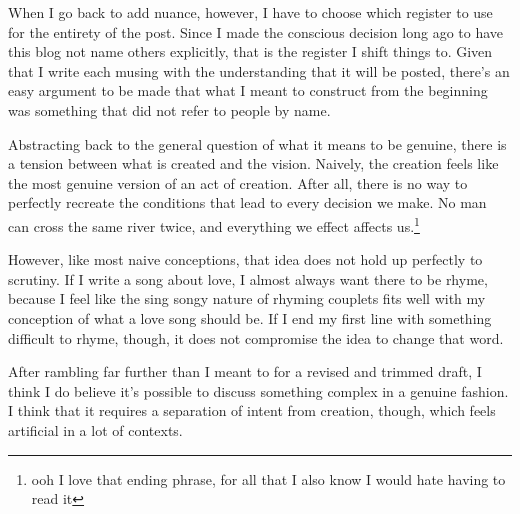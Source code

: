 \documentclass[12pt]{article}[titlepage]
\newcommand{\1}{\={a}}
\newcommand{\2}{\={e}}
\newcommand{\3}{\={\i}}
\newcommand{\4}{\=o}
\newcommand{\5}{\=u}
\newcommand{\6}{\={A}}
\renewcommand{\,}{\textsuperscript{,}}
\begin{document}
When I go back to add nuance, however, I have to choose which register to use for the entirety of the post.
Since I made the conscious decision long ago to have this blog not name others explicitly, that is the register I shift things to.
Given that I write each musing with the understanding that it will be posted, there's an easy argument to be made that what I meant to construct from the beginning was something that did not refer to people by name.

Abstracting back to the general question of what it means to be genuine, there is a tension between what is created and the vision.
Naively, the creation feels like the most genuine version of an act of creation.
After all, there is no way to perfectly recreate the conditions that lead to every decision we make.
No man can cross the same river twice, and everything we effect affects us.\footnote{ooh I love that ending phrase, for all that I also know I would hate having to read it}

However, like most naive conceptions, that idea does not hold up perfectly to scrutiny.
If I write a song about love, I almost always want there to be rhyme, because I feel like the sing songy nature of rhyming couplets fits well with my conception of what a love song should be.
If I end my first line with something difficult to rhyme, though, it does not compromise the idea to change that word.

After rambling far further than I meant to for a revised and trimmed draft, I think I do believe it's possible to discuss something complex in a genuine fashion.
I think that it requires a separation of intent from creation, though, which feels artificial in a lot of contexts.
\end{document}
